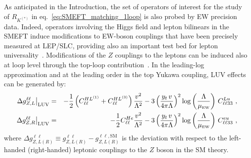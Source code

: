 As anticipated in the Introduction, the set of operators of interest for the study of $R_{K^{(*)}}$ in eq.~\eqref{eq:SMEFT_matching_1loop} is also probed by EW precision data. Indeed, operators involving the Higgs field and lepton bilinears in the SMEFT induce modifications to EW-boson couplings that have been precisely measured at LEP/SLC, providing also an important test bed for lepton universality~\cite{Efrati:2015eaa,deBlas:2016ojx}. Modifications of the $Z$ couplings to the leptons can be induced also at loop level through the top-loop contribution~\cite{deBlas:2015aea}. In the leading-log approximation and at the leading order in the top Yukawa coupling, LUV effects can be generated by:
%
\begin{eqnarray}
	\label{eq:OLuedRGE}
	\left.\Delta g_{Z,L}^{\ell\ell}\right|_{\mathrm{LUV}} & = &
	- \frac 12 \left( C_{\ell\ell}^{HL^{(1)}}+C_{\ell\ell}^{HL^{(3)}}\right)\frac{v^2}{\Lambda^2}-
	3 \left( \frac{ y_t \, v}{4 \pi \Lambda} \right)^2 \log\left(\frac{\Lambda}{\mu_{\textrm{\tiny{EW}}}} \right) \, C^{Lu}_{\ell\ell33}  \ , \\ \nonumber
	\left.\Delta g_{Z,R}^{\ell\ell}\right|_{\mathrm{LUV}} & = & 
	- \frac 12 C_{\ell\ell}^{He}\frac{v^2}{\Lambda^2}-
	3 \left( \frac{ y_t \, v}{4 \pi \Lambda} \right)^2 \log\left(\frac{\Lambda }{\mu_{\textrm{\tiny{EW}}}}\right) \, C^{eu}_{\ell\ell33} \ ,
\end{eqnarray}
where $\Delta g_{Z,L (R)}^{\ell\ell} \equiv g_{Z,L(R)}^{\ell\ell} - g_{Z,L (R)}^{\ell\ell,\textrm{SM}}$ is the deviation with respect to the left-handed (right-handed) leptonic couplings to the $Z$ boson in the SM theory.

